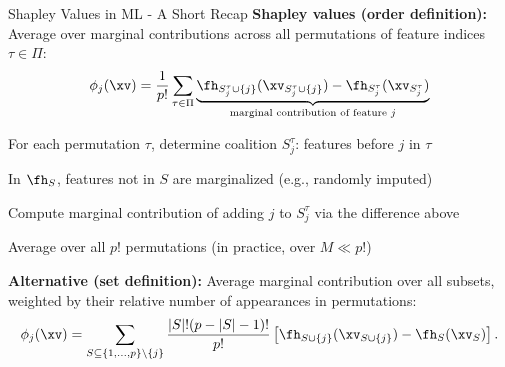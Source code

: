 \documentclass[10pt,compress,t,notes=noshow, xcolor=table]{beamer}
\newcommand{\Stau}{S_{j}^\tau}%
\newcommand{\Stauj}{\Stau \cup \{j\}}
\begin{document}
\begin{framev}[align=top]{Shapley Values in ML - A Short Recap}
% 
% 
\textbf{Shapley values (order definition):} Average over marginal contributions across all permutations of feature indices $\tau \in \Pi$:
$$
\phi_j(\xv) = \frac{1}{p!} \sum_{\tau \in \Pi} 
\underbrace{\fh_{\Stauj}(\xv_{\Stauj}) - \fh_{\Stau}(\xv_{\Stau})}_{\text{marginal contribution of feature $j$}}
$$
\begin{itemizeM}
\item For each permutation $\tau$, determine coalition $\Stau$: features before $j$ in $\tau$
\item In $\fh_S$, features not in $S$ are marginalized (e.g., randomly imputed)
\item Compute marginal contribution of adding $j$ to $\Stau$ via the difference above
\item Average over all $p!$ permutations (in practice, over $M \ll p!$)
\end{itemizeM}
\pause
\spacer[0.25]
\textbf{Alternative (set definition):} Average marginal contribution over all subsets, weighted by their relative number of appearances in permutations:
$$
\phi_j(\xv) = 
\sum_{S \subseteq \{1,\dots,p\} \setminus \{j\}} \frac{|S|!(p - |S| - 1)!}{p!} \left[\fh_{S \cup \{j\}}(\xv_{S \cup \{j\}}) - \fh_S(\xv_S)\right].
$$
% 
% 

\end{framev}
\end{document}
